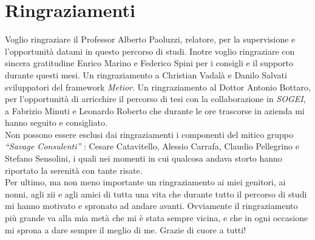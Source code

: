 \chapter{Ringraziamenti}
\label{cha:acknowledgements}

Voglio ringraziare il Professor Alberto Paoluzzi, relatore, per la supervisione e l'opportunità datami in questo percorso di studi.
Inotre voglio ringraziare con sincera gratitudine Enrico Marino e Federico Spini per i consigli e il supporto durante questi mesi.
Un ringraziamento a Christian Vadalà e Danilo Salvati sviluppatori del framework \emph{Metior}.
Un ringraziamento al Dottor Antonio Bottaro, per l'opportunità di arricchire il percorso di tesi con la collaborazione in \emph{SOGEI},
a Fabrizio Minuti e Leonardo Roberto che durante le ore trascorse in azienda mi hanno seguito e consigliato.\\
\indent
Non possono essere esclusi dai ringraziamenti i componenti del mitico gruppo \emph{``Savage Consulenti''} :
Cesare Catavitello, Alessio Carrafa, Claudio Pellegrino e Stefano Sensolini, i quali nei momenti in cui qualcosa andava
storto hanno riportato la serenità con tante risate.\\
\indent
Per ultimo, ma non meno importante un ringraziamento ai miei genitori, ai nonni, agli zii e agli amici di tutta una vita
che durante tutto il percorso di studi mi hanno motivato e spronato ad andare avanti.
Ovviamente il ringraziamento più grande va alla mia metà che mi è stata sempre vicina, e che in ogni occasione mi sprona
a dare sempre il meglio di me. Grazie di cuore a tutti!
